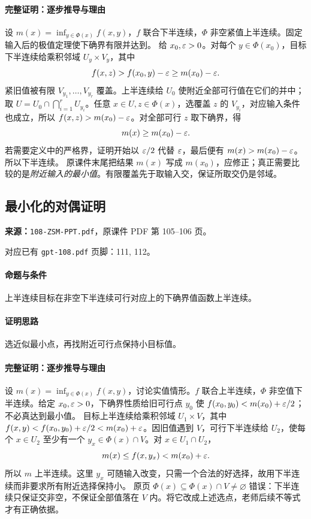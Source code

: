 \paragraph{完整证明：逐步推导与理由}

设 $m(x)=\inf_{y\in\Phi(x)}f(x,y)$，$f$ 联合下半连续，$\Phi$ 非空紧值上半连续。固定输入后的极值定理使下确界有限并达到。
给 $x_0,\varepsilon>0$。对每个 $y\in\Phi(x_0)$，目标下半连续给乘积邻域 $U_y\times V_y$，其中
\[f(x,z)>f(x_0,y)-\varepsilon\ge m(x_0)-\varepsilon.\]
紧旧值被有限 $V_{y_1},\ldots,V_{y_r}$ 覆盖。上半连续给 $U_0$ 使附近全部可行值在它们的并中；取 $U=U_0\cap\bigcap_{i=1}^rU_{y_i}$。任意 $x\in U,z\in\Phi(x)$，选覆盖 $z$ 的 $V_{y_i}$，对应输入条件也成立，所以 $f(x,z)>m(x_0)-\varepsilon$。对全部可行 $z$ 取下确界，得
\[m(x)\ge m(x_0)-\varepsilon.\]
若需要定义中的严格界，证明开始以 $\varepsilon/2$ 代替 $\varepsilon$，最后便有 $m(x)>m(x_0)-\varepsilon$。所以下半连续。
原课件末尾把结果 $m(x)$ 写成 $m(x_0)$，应修正；真正需要比较的是\emph{附近输入的最小值}。有限覆盖先于取输入交，保证所取交仍是邻域。

\clearpage\subsection{最小化的对偶证明}
\textbf{来源：}\texttt{108-ZSM-PPT.pdf}，原课件 PDF 第 105--106 页。\par
对应已有 \texttt{gpt-108.pdf} 页脚：111, 112。\par
\paragraph{命题与条件}上半连续目标在非空下半连续可行对应上的下确界值函数上半连续。
\paragraph{证明思路}选近似最小点，再找附近可行点保持小目标值。
\paragraph{完整证明：逐步推导与理由}

设 $m(x)=\inf_{y\in\Phi(x)}f(x,y)$，讨论实值情形。$f$ 联合上半连续，$\Phi$ 非空值下半连续。给定 $x_0,\varepsilon>0$，下确界性质给旧可行点 $y_0$ 使 $f(x_0,y_0)<m(x_0)+\varepsilon/2$；不必真达到最小值。
目标上半连续给乘积邻域 $U_1\times V$，其中 $f(x,y)<f(x_0,y_0)+\varepsilon/2<m(x_0)+\varepsilon$。因旧值遇到 $V$，可行下半连续给 $U_2$，使每个 $x\in U_2$ 至少有一个 $y_x\in\Phi(x)\cap V$。对 $x\in U_1\cap U_2$，
\[m(x)\le f(x,y_x)<m(x_0)+\varepsilon.\]
所以 $m$ 上半连续。这里 $y_x$ 可随输入改变，只需一个合法的好选择，故用下半连续而非要求所有附近选择保持小。
原页 $\Phi(x)\subseteq\Phi(x)\cap V\ne\varnothing$ 错误：下半连续只保证交非空，不保证全部值落在 $V$ 内。将它改成上述选点，老师后续不等式才有正确依据。

